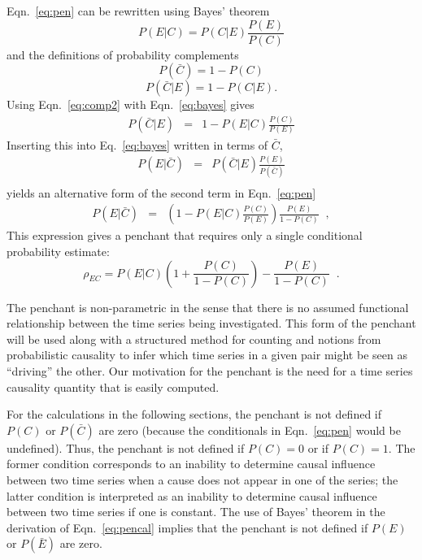 \documentclass[twocolumn,aps,pre,groupedaddress]{revtex4-1}
\begin{document}
Eqn.\ \ref{eq:pen} can be rewritten using Bayes' theorem 
\begin{equation}
\label{eq:bayes}
P(E|C) = P(C|E)\frac{P(E)}{P(C)}
\end{equation}
and the definitions of probability complements
\begin{equation}
\label{eq:comp1}
P(\bar{C}) = 1-P(C)
\end{equation}
\begin{equation}
\label{eq:comp2}
P(\bar{C}|E) = 1-P(C|E).  
\end{equation}
Using Eqn.\ \ref{eq:comp2} with Eqn.\ \ref{eq:bayes} gives 
\begin{eqnarray*}
P(\bar{C}|E) &=& 1-P(E|C)\frac{P(C)}{P(E)}
\end{eqnarray*}
Inserting this into Eq.\ \ref{eq:bayes} written in terms of $\bar{C}$\;\;,
\begin{eqnarray*}
P(E|\bar{C}) &=& P(\bar{C}|E)\frac{P(E)}{P(\bar{C})}\\
\end{eqnarray*}
yields an alternative form of the second term in Eqn.\ \ref{eq:pen}
\begin{eqnarray*}
P(E|\bar{C}) &=&\left(1-P(E|C)\frac{P(C)}{P(E)}\right)\frac{P(E)}{1-P(C)}\;\;,
\end{eqnarray*}
This expression gives a penchant that requires only a single conditional probability estimate:
\begin{equation}
\label{eq:pencal}
\rho_{EC} = P(E|C)\left(1+\frac{P(C)}{1-P(C)}\right)-\frac{P(E)}{1-P(C)}\;\;.
\end{equation}

The penchant is non-parametric in the sense that there is no assumed functional relationship between the time series being investigated.  This form of the penchant will be used along with a structured method for counting and notions from probabilistic causality to infer which time series in a given pair might be seen as ``driving'' the other.  Our motivation for the penchant is the need for a time series causality quantity that is easily computed.  

For the calculations in the following sections, the penchant is not defined if $P(C)$ or $P(\bar{C})$ are zero (because the conditionals in Eqn.\ \ref{eq:pen} would be undefined).  Thus, the penchant is not defined if $P(C)=0$ or if $P(C)=1$.  The former condition corresponds to an inability to determine causal influence between two time series when a cause does not appear in one of the series; the latter condition is interpreted as an inability to determine causal influence between two time series if one is constant.  The use of Bayes' theorem in the derivation of Eqn.\ \ref{eq:pencal} implies that the penchant is not defined if $P(E)$ or $P(\bar{E})$ are zero.
\end{document}
